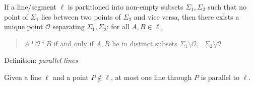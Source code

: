 \begin{minipage}[t]{0.48\linewidth}
	
	\phantom{bob}\smallbreak
	
	If a line/segment $\ell$ is partitioned into non-empty subsets $\Sigma_1,\Sigma_2$ such that no point of $\Sigma_1$ lies between two points of $\Sigma_2$ and vice versa, then there exists a unique point $\mathcal O$ separating $\Sigma_1,\Sigma_2$:
	for all $A,B\in\ell$,
	\begin{quote}
		$A*\mathcal O*B$ if and only if $A,B$ lie in distinct subsets $\Sigma_1\setminus\mathcal O$, \ $\Sigma_2\setminus\mathcal O$%
	\end{quote}
	
	
	\phantom{bob}\smallbreak
	
	Definition: \emph{parallel lines}\smallbreak
	
	Given a line $\ell$ and a point $P\notin\ell$, at most one line through $P$ is parallel to $\ell$.
\end{minipage}


\clearpage



